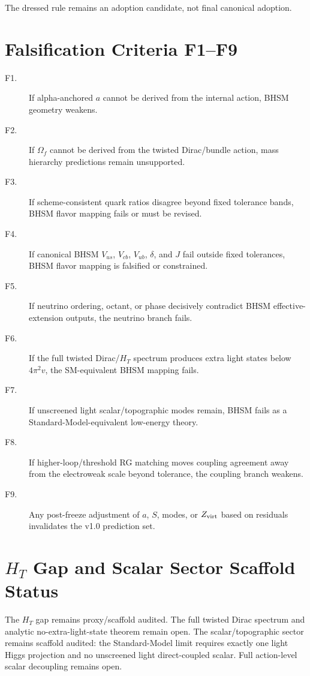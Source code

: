 \documentclass[11pt]{article}
\newcommand{\HT}{\ensuremath{H_T}}
\begin{document}
The dressed rule remains an adoption candidate, not final canonical adoption.

\section{Falsification Criteria F1--F9}

\begin{description}
\item[F1.] If alpha-anchored $a$ cannot be derived from the internal action,
BHSM geometry weakens.
\item[F2.] If $\Omega_f$ cannot be derived from the twisted Dirac/bundle
action, mass hierarchy predictions remain unsupported.
\item[F3.] If scheme-consistent quark ratios disagree beyond fixed tolerance
bands, BHSM flavor mapping fails or must be revised.
\item[F4.] If canonical BHSM $V_{us}$, $V_{cb}$, $V_{ub}$, $\delta$, and $J$
fail outside fixed tolerances, BHSM flavor mapping is falsified or constrained.
\item[F5.] If neutrino ordering, octant, or phase decisively contradict BHSM
effective-extension outputs, the neutrino branch fails.
\item[F6.] If the full twisted Dirac/\HT{} spectrum produces extra light states
below $4\pi^2v$, the SM-equivalent BHSM mapping fails.
\item[F7.] If unscreened light scalar/topographic modes remain, BHSM fails as a
Standard-Model-equivalent low-energy theory.
\item[F8.] If higher-loop/threshold RG matching moves coupling agreement away
from the electroweak scale beyond tolerance, the coupling branch weakens.
\item[F9.] Any post-freeze adjustment of $a$, $S$, modes, or $Z_{\rm virt}$
based on residuals invalidates the v1.0 prediction set.
\end{description}

\section{\texorpdfstring{$H_T$}{H\_T} Gap and Scalar Sector Scaffold Status}

The \HT{} gap remains proxy/scaffold audited. The full twisted Dirac spectrum
and analytic no-extra-light-state theorem remain open. The scalar/topographic
sector remains scaffold audited: the Standard-Model limit requires exactly one
light Higgs projection and no unscreened light direct-coupled scalar. Full
action-level scalar decoupling remains open.
\end{document}
